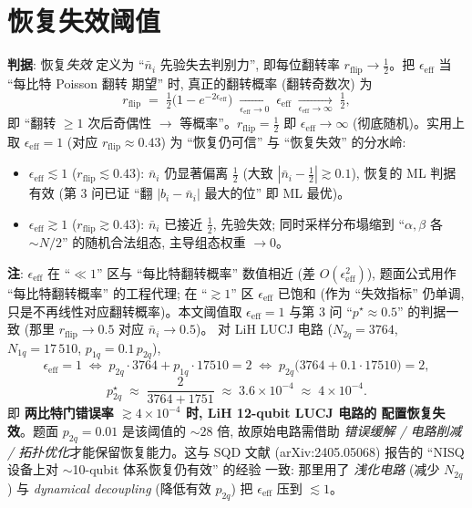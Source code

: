 \documentclass[11pt]{article}
\begin{document}
\section{恢复失效阈值}
\label{sec:fail}
\textbf{判据}: 恢复\emph{失效} 定义为 ``$\bar n_i$ 先验失去判别力'', 即每位翻转率
$r_{\text{flip}}\to\tfrac12$。把 $\epsilon_{\text{eff}}$ 当 ``每比特 Poisson 翻转
期望'' 时, 真正的翻转概率 (翻转奇数次) 为
\[
  r_{\text{flip}}\;=\;\tfrac12\bigl(1-e^{-2\epsilon_{\text{eff}}}\bigr)
  \;\xrightarrow[\epsilon_{\text{eff}}\to0]{}\;\epsilon_{\text{eff}}
  \;\xrightarrow[\epsilon_{\text{eff}}\to\infty]{}\;\tfrac12,
\]
即 ``翻转 $\ge1$ 次后奇偶性 $\to$ 等概率''。$r_{\text{flip}}=\tfrac12$ 即
$\epsilon_{\text{eff}}\to\infty$ (彻底随机)。实用上取 \textbf{$\epsilon_{\text{eff}}=1$}
(对应 $r_{\text{flip}}\approx0.43$) 为 ``恢复仍可信'' 与 ``恢复失效'' 的分水岭:
\begin{itemize}
  \item $\epsilon_{\text{eff}}\lesssim1$ ($r_{\text{flip}}\lesssim0.43$):
        $\bar n_i$ 仍显著偏离 $\tfrac12$ (大致 $|\bar n_i-\tfrac12|\gtrsim0.1$),
        恢复的 ML 判据有效 (第 3 问已证 ``翻 $|b_i-\bar n_i|$ 最大的位'' 即 ML 最优)。
  \item $\epsilon_{\text{eff}}\gtrsim1$ ($r_{\text{flip}}\gtrsim0.43$):
        $\bar n_i$ 已接近 $\tfrac12$, 先验失效; 同时采样分布塌缩到 ``$\alpha,\beta$
        各 $\sim N/2$'' 的随机合法组态, 主导组态权重 $\to0$。
\end{itemize}
\textbf{注}: $\epsilon_{\text{eff}}$ 在 ``$\ll1$'' 区与 ``每比特翻转概率'' 数值相近
(差 $O(\epsilon_{\text{eff}}^2)$), 题面公式用作 ``每比特翻转概率'' 的工程代理;
在 ``$\gtrsim1$'' 区 $\epsilon_{\text{eff}}$ 已饱和 (作为 ``失效指标'' 仍单调,
只是不再线性对应翻转概率)。本文阈值取 $\epsilon_{\text{eff}}=1$ 与第 3 问
``$p^\star\approx0.5$'' 的判据一致 (那里 $r_{\text{flip}}\to0.5$ 对应 $\bar n_i\to0.5$)。
对 LiH LUCJ 电路 ($N_{2q}{=}3764$, $N_{1q}{=}17\,510$, $p_{1q}{=}0.1\,p_{2q}$),
\[
  \epsilon_{\text{eff}}=1\;\Longleftrightarrow\;
  p_{2q}\cdot3764+p_{1q}\cdot17510=2
  \;\Longleftrightarrow\;
  p_{2q}\bigl(3764+0.1\cdot17510\bigr)=2,
\]
\[
  \boxed{\;p_{2q}^{\star}\;\approx\;\frac{2}{3764+1751}
        \;\approx\;3.6\times10^{-4}\;\approx\;4\times10^{-4}.\;}
\]
即 \textbf{两比特门错误率 $\gtrsim4{\times}10^{-4}$ 时, LiH 12-qubit LUCJ 电路的
配置恢复失效}。题面 $p_{2q}{=}0.01$ 是该阈值的 $\sim 28$ 倍, 故原始电路需借助
\emph{错误缓解 / 电路削减 / 拓扑优化}才能保留恢复能力。这与 SQD 文献
(arXiv:2405.05068) 报告的 ``NISQ 设备上对 $\sim$10-qubit 体系恢复仍有效'' 的经验
一致: 那里用了 \emph{浅化电路} (减少 $N_{2q}$) 与 \emph{dynamical decoupling}
(降低有效 $p_{2q}$) 把 $\epsilon_{\text{eff}}$ 压到 $\lesssim1$。
\end{document}
